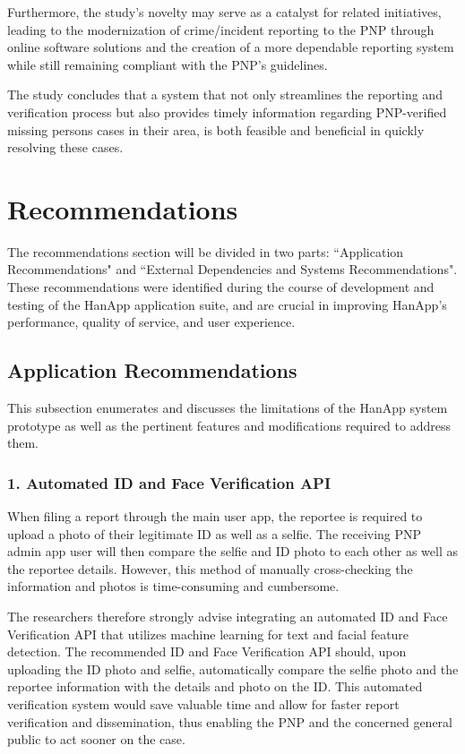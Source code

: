 Furthermore, the study's novelty may serve as a catalyst for related initiatives, leading to the modernization of crime/incident reporting to the PNP through online software solutions and the creation of a more dependable reporting system while still remaining compliant with the PNP's guidelines.

The study concludes that a system that not only streamlines the reporting and verification process but also provides timely information regarding PNP-verified missing persons cases in their area, is both feasible and beneficial in quickly resolving these cases.


\section{Recommendations}

The recommendations section will be divided in two parts: ``Application Recommendations" and ``External Dependencies and Systems Recommendations".  These recommendations were identified during the course of development and testing of the HanApp application suite, and are crucial in improving HanApp's performance, quality of service, and user experience.

\subsection{Application Recommendations}

This subsection enumerates and discusses the limitations of the HanApp system prototype as well as the pertinent features and modifications required to address them.

\subsubsection{1. Automated ID and Face Verification API}
When filing a report through the main user app, the reportee is required to upload a photo of their legitimate ID as well as a selfie. The receiving PNP admin app user will then compare the selfie and ID photo to each other as well as the reportee details. However, this method of manually cross-checking the information and photos is time-consuming and cumbersome. 

The researchers therefore strongly advise integrating an automated ID and Face Verification API that utilizes machine learning for text and facial feature detection. The recommended ID and Face Verification API should, upon uploading the ID photo and selfie, automatically compare the selfie photo and the reportee information with the details and photo on the ID. This automated verification system would save valuable time and allow for faster report verification and dissemination, thus enabling the PNP and the concerned general public to act sooner on the case.

